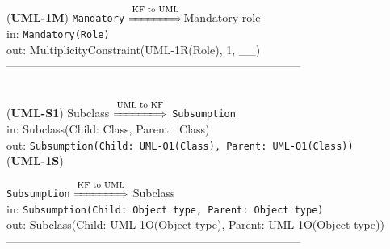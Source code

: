 \documentclass[sn-mathphys]{sn-jnl}
\begin{document}
{({\bf UML-1M}) {\tt Mandatory} $\overset{\text{KF to UML}}{\xLongrightarrow{\hspace*{1.4cm}}}${Mandatory role}\\
\hspace*{0.3cm}in: {\tt Mandatory(Role)}\\
\hspace*{0.5cm}out: {MultiplicityConstraint(UML-1R(Role), 1, \_\_)}\\

------------------------------------------------------------------------------
\\ \

({\bf UML-S1}) {Subclass} $\overset{\text{UML to KF}}{\xLongrightarrow{\hspace*{1.4cm}}}$ {\tt Subsumption}\\
\hspace*{0.3cm}in: {Subclass(Child: Class, Parent : Class)} \\
\hspace*{0.5cm}out:  {\tt Subsumption(Child: UML-O1(Class), Parent: UML-O1(Class))}\\


({\bf UML-1S}) {{\tt Subsumption} $\overset{\text{KF to UML}}{\xLongrightarrow{\hspace*{1.4cm}}}$ {Subclass}\\
\hspace*{0.3cm}in: {\tt Subsumption(Child: Object type, Parent: Object type)} \\
\hspace*{0.5cm}out:  {Subclass(Child: UML-1O(Object type), Parent: UML-1O(Object type))}\\
 
------------------------------------------------------------------------------
\\ \

}}
\end{document}
